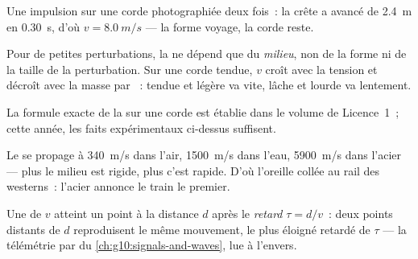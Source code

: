 \begin{omfigure}

{\small Une impulsion sur une corde photographiée deux fois~: la crête a
avancé de \qty{2.4}{m} en \qty{0.30}{s}, d'où $v = \qty{8.0}{m/s}$ ---
la forme voyage, la corde reste.}
\end{omfigure}

\begin{proposition}\label{prop:g12:mechanical-waves:medium}
Pour de petites perturbations, la  ne dépend que du
\emph{milieu}, non de la forme ni de la taille de la perturbation. Sur
une corde tendue, $v$ croît avec la tension et décroît avec la masse
par ~: tendue et légère va vite, lâche et lourde va lentement.
\admitted
\end{proposition}

\begin{remark}\label{rem:g12:mechanical-waves:ropeformula}
La formule exacte de la  sur une corde est établie dans le
volume de Licence~1~; cette année, les faits expérimentaux ci-dessus
suffisent.
\end{remark}

\begin{example}\label{ex:g12:mechanical-waves:speeds}
Le  se propage à \qty{340}{m/s} dans l'air, \qty{1500}{m/s}
dans l'eau, \qty{5900}{m/s} dans l'acier --- plus le milieu est
rigide, plus c'est rapide. D'où l'oreille collée au rail des westerns~:
l'acier annonce le train le premier.
\end{example}

\begin{definition}[Retard]\label{def:g12:mechanical-waves:delay}
Une  de  $v$ atteint un point à la distance $d$ après
le \emph{retard} $\tau = d/v$~: deux points distants de $d$
reproduisent le même mouvement, le plus éloigné retardé de $\tau$ ---
la télémétrie par  du \cref{ch:g10:signals-and-waves}, lue
à l'envers.
\end{definition}

